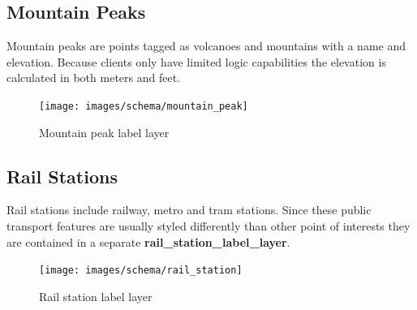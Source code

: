\subsection{Mountain Peaks}

Mountain peaks are points tagged as volcanoes and mountains with a name and elevation. Because clients only have limited logic capabilities the elevation is calculated in both meters and feet.

\begin{figure}[H]
  \centering
  \texttt{[image: images/schema/mountain\_peak]}
  \caption{Mountain peak label layer}
\end{figure}

\subsection{Rail Stations}

Rail stations include railway, metro and tram stations. Since these
public transport features are usually styled differently than other point of
interests they are contained in a separate \textbf{rail\_station\_label\_layer}.

\begin{figure}[H]
  \centering
  \texttt{[image: images/schema/rail\_station]}
  \caption{Rail station label layer}
\end{figure}